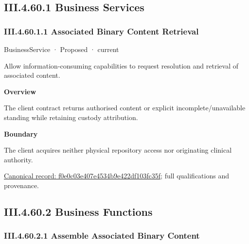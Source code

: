 \subsection*{III.4.60.1 Business Services}
\label{navigation:III.4.60.1}

\subsubsection*{III.4.60.1.1 Associated Binary Content Retrieval}
\label{navigation:III.4.60.1.1}

\label{element:f0e0c03e407e4534b9e422df103fc35f}
{\small BusinessService · Proposed · current}\par

Allow information-consuming capabilities to request resolution and retrieval of associated content.



\textbf{Overview}



The client contract returns authorised content or explicit incomplete/unavailable standing while retaining custody attribution.



\textbf{Boundary}



The client acquires neither physical repository access nor originating clinical authority.


{\footnotesize \href{../../../../continuum/business/business-service/f0e0c03e407e4534b9e422df103fc35f.md}{Canonical record: f0e0c03e407e4534b9e422df103fc35f}; full qualifications and provenance.}\par
\subsection*{III.4.60.2 Business Functions}
\label{navigation:III.4.60.2}

\subsubsection*{III.4.60.2.1 Assemble Associated Binary Content}
\label{navigation:III.4.60.2.1}

